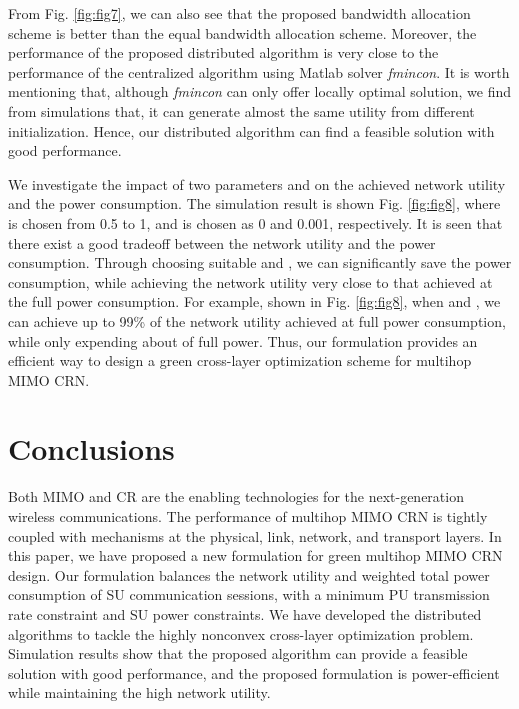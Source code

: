 \documentclass[12pt,onecolumn,tworows]{IEEEtran}
\begin{document}
From Fig. \ref{fig:fig7}, we can also see that the proposed bandwidth allocation scheme is better than the equal bandwidth allocation scheme. Moreover, the performance of the proposed distributed algorithm is very close to the performance of the centralized algorithm using Matlab solver \emph{fmincon}. It is worth mentioning that, although \emph{fmincon} can only offer locally optimal solution, we find from simulations that, it can generate almost the same utility from different initialization. Hence, our distributed algorithm can find a feasible solution with good performance.

We investigate the impact of two parameters  and  on the achieved network utility and the power consumption. The simulation result is shown Fig. \ref{fig:fig8}, where  is chosen from 0.5 to 1, and   is chosen as 0 and 0.001, respectively. It is seen that there exist a good tradeoff between the network utility and the power consumption. Through choosing suitable  and , we can significantly save the power consumption, while achieving the network utility very close to that achieved at the full power consumption. For example, shown in Fig. \ref{fig:fig8}, when  and ,
we can achieve up to 99\% of the network utility achieved at full power consumption, while only expending about  of full power. Thus, our formulation provides an efficient way to design a green cross-layer optimization scheme for multihop MIMO CRN.





\section{Conclusions}
Both MIMO and CR are the enabling technologies for the next-generation wireless communications.
The performance of multihop MIMO CRN is tightly coupled with mechanisms at the physical, link, network, and transport layers. In this paper, we have proposed a new formulation for green multihop MIMO CRN design. Our formulation balances the network utility and weighted total power consumption of SU communication sessions, with a minimum PU transmission rate constraint and SU power constraints. We have developed the distributed algorithms to tackle the highly nonconvex cross-layer optimization problem. Simulation results show that the proposed algorithm can provide a feasible solution with good performance, and the proposed formulation is power-efficient while maintaining the high network utility.

\ifCLASSOPTIONcaptionsoff
  \newpage
\fi
\end{document}
